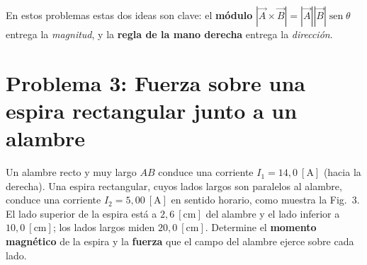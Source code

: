 \documentclass[12pt,letterpaper]{article}
\begin{document}
\noindent En estos problemas estas dos ideas son clave: el \textbf{m\'odulo}
$|\vec{A}\times\vec{B}| = |\vec{A}||\vec{B}|\operatorname{sen}\theta$ entrega la \emph{magnitud}, y
la \textbf{regla de la mano derecha} entrega la \emph{direcci\'on}.

\vspace{0.4cm}

\section*{Problema 3: Fuerza sobre una espira rectangular junto a un alambre}

\noindent Un alambre recto y muy largo $AB$ conduce una corriente $I_1 = 14{,}0\ [\text{A}]$
(hacia la derecha). Una espira rectangular, cuyos lados largos son paralelos al alambre,
conduce una corriente $I_2 = 5{,}00\ [\text{A}]$ en sentido horario, como muestra la Fig.\ 3.
El lado superior de la espira est\'a a $2{,}6\ [\text{cm}]$ del alambre y el lado inferior a
$10{,}0\ [\text{cm}]$; los lados largos miden $20{,}0\ [\text{cm}]$. Determine el
\textbf{momento magn\'etico} de la espira y la \textbf{fuerza} que el campo del alambre ejerce
sobre cada lado.

\medskip
\end{document}
